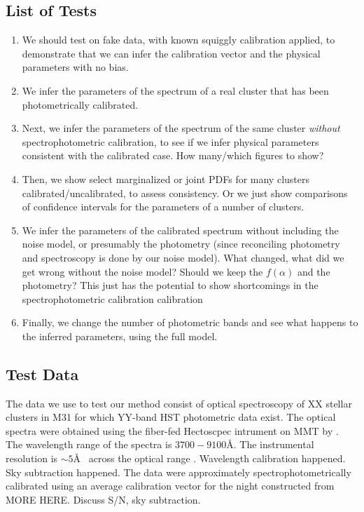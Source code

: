 \documentclass[iop,numberedappendix]{emulateapj}
\begin{document}
\subsection{List of Tests}

\begin{enumerate}

\item We should test on fake data, with known squiggly
  calibration applied, to demonstrate that we can infer the
  calibration vector and the physical parameters with no bias.

\item We infer the parameters of the spectrum of a real cluster that
  has been photometrically calibrated. 

\item Next, we infer the parameters of the spectrum of the same
cluster \emph{without} spectrophotometric calibration, to see if we
infer physical parameters consistent with the calibrated case.  How
many/which figures to show?

\item  Then, we show select marginalized or joint PDFs for many
clusters calibrated/uncalibrated, to assess consistency.  Or we just
show comparisons of confidence intervals for the parameters of a
number of clusters.

\item We infer the parameters of the calibrated spectrum without
including the noise model, or presumably the photometry (since
reconciling photometry and spectroscopy is done by our noise model).
What changed, what did we get wrong without the noise model?
{\color{blue} Should we keep the $f(\alpha)$ and the photometry?  This
just has the potential to show shortcomings in the spectrophotometric
calibration calibration}

\item Finally, we change the number of photometric bands and see what
happens to the inferred parameters, using the full model.

\end{enumerate}

\subsection{Test Data}

The data we use to test our method consist of optical spectroscopy of
XX stellar clusters in M31 for which YY-band HST photometric data
exist.  The optical spectra were obtained using the fiber-fed
Hectoscpec intrument on MMT by \citet{caldwell}.  The wavelength range
of the spectra is $3700-9100$\AA. The instrumental resolution is
$\sim 5$\AA~ across the optical range \citep{fabricant13}.  {\color{blue} Wavelength
calibration happened. Sky subtraction happened.} The data were
approximately spectrophotometrically calibrated using an average
calibration vector for the night constructed from {\color{blue} MORE
HERE. Discuss S/N, sky subtraction.}
\end{document}
